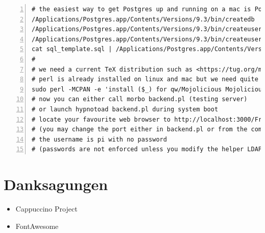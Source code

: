 \documentclass[11pt,oneside]{scrbook}
\begin{document}
\begin{appendix}
\begin{lstlisting}[caption=Installationsbefehle beispielhaft fuer MacOS X.,  label= lst:form, basicstyle={\small\ttfamily}, numbers=left]
# the easiest way to get Postgres up and running on a mac is Postgres.app
/Applications/Postgres.app/Contents/Versions/9.3/bin/createdb  aug_clinical
/Applications/Postgres.app/Contents/Versions/9.3/bin/createuser postgres -s
/Applications/Postgres.app/Contents/Versions/9.3/bin/createuser root -s
cat sql_template.sql | /Applications/Postgres.app/Contents/Versions/9.3/bin/psql aug_clinical
#
# we need a current TeX distribution such as <https://tug.org/mactex/>
# perl is already installed on linux and mac but we need quite a bunch of non-core perl modules
sudo perl -MCPAN -e 'install ($_) for qw/Mojolicious Mojolicious::Plugin::Database Mojolicious::Plugin::RenderFile SQL::Abstract::More Apache::Session::File Spreadsheet::WriteExcel Spreadsheet::ParseExcel Business::IBAN DBD::Pg Date::ICal Data::ICal Data::ICal::Entry::TimeZone/'
# now you can either call morbo backend.pl (testing server)
# or launch hypnotoad backend.pl during system boot
# locate your favourite web browser to http://localhost:3000/Frontend/index.html
# (you may change the port either in backend.pl or from the command line)
# the username is pi with no password
# (passwords are not enforced unless you modify the helper LDAPChallenge with backend.pl appropriately)
\end{lstlisting}

\chapter{Danksagungen}

\begin{itemize}
\item Cappuccino Project
\item FontAwesome

\end{itemize}

\end{appendix}
\end{document}
